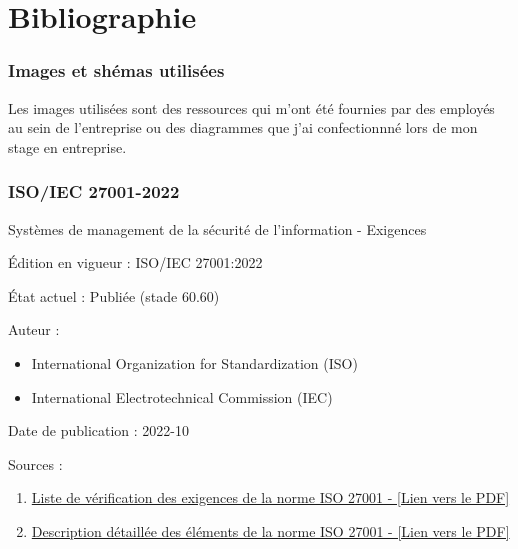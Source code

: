 \section*{Bibliographie}
\subsubsection{Images et shémas utilisées}\label{images}
Les images utilisées sont des ressources qui m'ont été fournies par des employés au sein de l'entreprise ou des diagrammes que j'ai confectionnné lors de mon stage en entreprise.

\subsubsection{ISO/IEC 27001-2022}\label{iso}
Systèmes de management de la sécurité de l'information - Exigences\par
Édition en vigueur : ISO/IEC 27001:2022\par
État actuel : Publiée (stade 60.60)\par
Auteur : 
\begin{itemize}
    \item International Organization for Standardization (ISO)
    \item International Electrotechnical Commission (IEC)
\end{itemize}\par
Date de publication : 2022-10\par
Sources : 
\begin{enumerate}
    \item \href{https://www.cssia.org/wp-content/uploads/2020/01/ISO_27001_Standard.pdf}{\textcolor{imtneCeleste}{Liste de vérification des exigences de la norme ISO 27001 - [Lien vers le PDF]}}
    \item \href{http://www.itref.ir/uploads/editor/2ef522.pdf}{\textcolor{imtneCeleste}{Description détaillée des éléments de la norme ISO 27001 - [Lien vers le PDF]}}
\end{enumerate}

